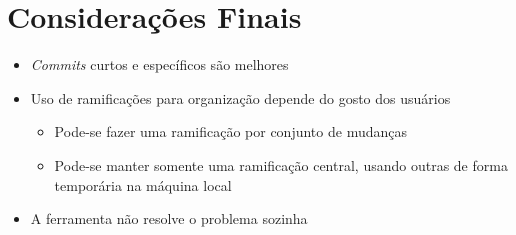 \documentclass{beamer}
\newenvironment{slide}{\begin{frame}{\insertsection}}{\end{frame}}
\begin{document}
\section{Considerações Finais}
\begin{slide}
    \begin{itemize}
        \item \emph{Commits} curtos e específicos são melhores
        \pause
        \item Uso de ramificações para organização depende do gosto dos usuários
        \begin{itemize}
            \pause
            \item Pode-se fazer uma ramificação por conjunto de mudanças
            \pause
            \item Pode-se manter somente uma ramificação central, usando outras
                de forma temporária na máquina local
        \end{itemize}
        \pause
        \item A ferramenta não resolve o problema sozinha
    \end{itemize}
\end{slide}
\end{document}
